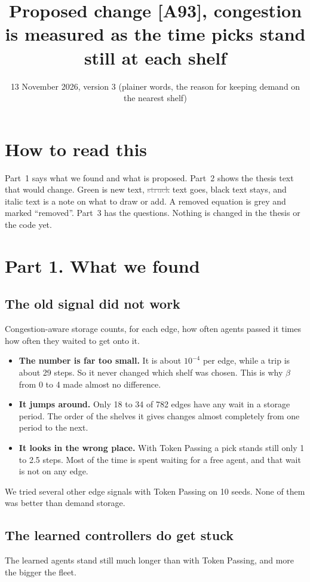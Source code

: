 \documentclass[11pt,a4paper]{article}
\title{Proposed change [A93], congestion is measured as the time picks stand still at each shelf}
\date{13 November 2026, version 3 (plainer words, the reason for keeping demand on the nearest shelf)}
\newcommand{\new}[1]{\textcolor{newc}{#1}}
\newcommand{\old}[1]{\textcolor{gray}{\sout{#1}}}
\begin{document}
\maketitle

\section*{How to read this}
Part~1 says what we found and what is proposed. Part~2 shows the thesis text that
would change. \new{Green} is new text, \old{struck} text goes, black text stays,
and italic text is a note on what to draw or add. A removed equation is grey and
marked ``removed''. Part~3 has the questions. Nothing is changed in the thesis or
the code yet.

\section*{Part 1. What we found}

\subsection*{The old signal did not work}
Congestion-aware storage counts, for each edge, how often agents passed it times
how often they waited to get onto it.

\begin{itemize}[leftmargin=1.2em]
\item \textbf{The number is far too small.} It is about $10^{-4}$ per edge, while a
  trip is about 29 steps. So it never changed which shelf was chosen. This is why
  $\beta$ from 0 to 4 made almost no difference.
\item \textbf{It jumps around.} Only 18 to 34 of 782 edges have any wait in a
  storage period. The order of the shelves it gives changes almost completely from
  one period to the next.
\item \textbf{It looks in the wrong place.} With Token Passing a pick stands still
  only 1 to 2.5 steps. Most of the time is spent waiting for a free agent, and that
  wait is not on any edge.
\end{itemize}

We tried several other edge signals with Token Passing on 10 seeds. None of them
was better than demand storage.

\subsection*{The learned controllers do get stuck}
The learned agents stand still much longer than with Token Passing, and more the
bigger the fleet.
\end{document}
